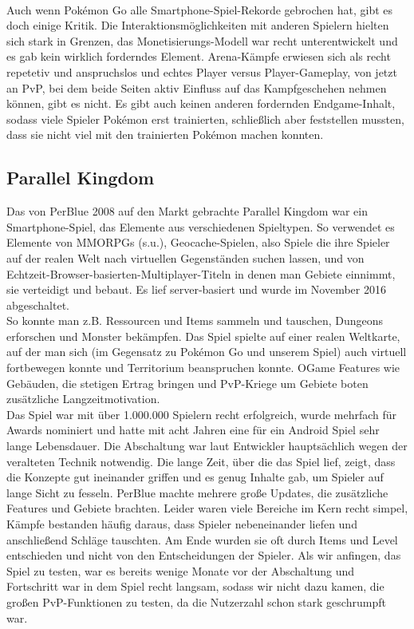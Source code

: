\documentclass[extern,palatino]{cgBA}
\begin{document}
\\Auch wenn Pokémon Go alle Smartphone-Spiel-Rekorde gebrochen hat, gibt es doch einige Kritik. Die Interaktionsmöglichkeiten mit anderen Spielern hielten sich stark in Grenzen, das Monetisierungs-Modell war recht unterentwickelt und es gab kein wirklich forderndes Element. Arena-Kämpfe erwiesen sich als recht repetetiv und anspruchslos und echtes Player versus Player-Gameplay, von jetzt an PvP, bei dem beide Seiten aktiv Einfluss auf das Kampfgeschehen nehmen können, gibt es nicht. Es gibt auch keinen anderen fordernden Endgame-Inhalt, sodass viele Spieler Pokémon erst trainierten, schließlich aber feststellen mussten, dass sie nicht viel mit den trainierten Pokémon machen konnten. %
\newpage
\subsection{Parallel Kingdom}
Das von PerBlue 2008 auf den Markt gebrachte Parallel Kingdom war ein Smartphone-Spiel, das Elemente aus verschiedenen Spieltypen. So verwendet es Elemente von MMORPGs (s.u.), Geocache-Spielen, also Spiele die ihre Spieler auf der realen Welt nach virtuellen Gegenständen suchen lassen, und von Echtzeit-Browser-basierten-Multiplayer-Titeln in denen man Gebiete einnimmt, sie verteidigt und bebaut. Es lief server-basiert und wurde im November 2016 abgeschaltet. %
\\So konnte man z.B. Ressourcen und Items sammeln und tauschen, Dungeons erforschen und Monster bekämpfen. Das Spiel spielte  auf einer realen Weltkarte, auf der man sich (im Gegensatz zu Pokémon Go und unserem Spiel) auch virtuell fortbewegen konnte und Territorium beanspruchen konnte. OGame Features wie Gebäuden, die stetigen Ertrag bringen und PvP-Kriege um Gebiete boten zusätzliche Langzeitmotivation.
\\Das Spiel war mit über 1.000.000 Spielern recht erfolgreich, wurde mehrfach für Awards nominiert und hatte mit acht Jahren eine für ein Android Spiel sehr lange Lebensdauer.  %
Die Abschaltung war laut Entwickler hauptsächlich wegen der veralteten Technik notwendig. %
Die lange Zeit, über die das Spiel lief, zeigt, dass die Konzepte gut ineinander griffen und es genug Inhalte gab, um Spieler auf lange Sicht zu fesseln. PerBlue machte mehrere große Updates, die zusätzliche Features und Gebiete brachten. Leider waren viele Bereiche im Kern recht simpel, Kämpfe bestanden häufig daraus, dass Spieler nebeneinander liefen und anschließend Schläge tauschten. Am Ende wurden sie oft durch Items und Level entschieden und nicht von den Entscheidungen der Spieler. Als wir anfingen, das Spiel zu testen, war es bereits wenige Monate vor der Abschaltung und Fortschritt war in dem Spiel recht langsam, sodass wir nicht dazu kamen, die großen PvP-Funktionen zu testen, da die Nutzerzahl schon stark geschrumpft war.
\end{document}
